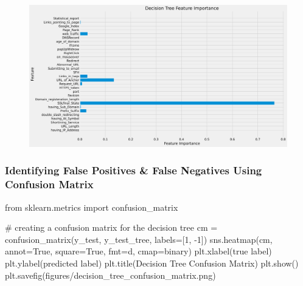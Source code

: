 \documentclass[
  letterpaper,
  DIV=11,
  numbers=noendperiod]{scrartcl}
\newenvironment{Shaded}{\begin{snugshade}}{\end{snugshade}}
\newcommand{\CommentTok}[1]{\textcolor[rgb]{0.37,0.37,0.37}{#1}}
\newcommand{\DecValTok}[1]{\textcolor[rgb]{0.68,0.00,0.00}{#1}}
\newcommand{\ImportTok}[1]{\textcolor[rgb]{0.00,0.46,0.62}{#1}}
\newcommand{\NormalTok}[1]{\textcolor[rgb]{0.00,0.23,0.31}{#1}}
\newcommand{\OperatorTok}[1]{\textcolor[rgb]{0.37,0.37,0.37}{#1}}
\newcommand{\StringTok}[1]{\textcolor[rgb]{0.13,0.47,0.30}{#1}}
\newcommand{\VariableTok}[1]{\textcolor[rgb]{0.07,0.07,0.07}{#1}}
\begin{document}
\begin{figure}[H]

{\centering \includegraphics{project_files/figure-pdf/cell-18-output-1.svg}

}

\end{figure}

\hypertarget{identifying-false-positives-false-negatives-using-confusion-matrix}{%
\subsubsection{Identifying False Positives \& False Negatives Using
Confusion
Matrix}\label{identifying-false-positives-false-negatives-using-confusion-matrix}}

\begin{Shaded}
\begin{Highlighting}[]
\ImportTok{from}\NormalTok{ sklearn.metrics }\ImportTok{import}\NormalTok{ confusion\_matrix}

\CommentTok{\# creating a confusion matrix for the decision tree}
\NormalTok{cm }\OperatorTok{=}\NormalTok{ confusion\_matrix(y\_test, y\_test\_tree, labels}\OperatorTok{=}\NormalTok{[}\DecValTok{1}\NormalTok{, }\OperatorTok{{-}}\DecValTok{1}\NormalTok{])}
\NormalTok{sns.heatmap(cm, annot}\OperatorTok{=}\VariableTok{True}\NormalTok{, square}\OperatorTok{=}\VariableTok{True}\NormalTok{, fmt}\OperatorTok{=}\StringTok{\textquotesingle{}d\textquotesingle{}}\NormalTok{, cmap}\OperatorTok{=}\StringTok{\textquotesingle{}binary\textquotesingle{}}\NormalTok{)}
\NormalTok{plt.xlabel(}\StringTok{\textquotesingle{}true label\textquotesingle{}}\NormalTok{)}
\NormalTok{plt.ylabel(}\StringTok{\textquotesingle{}predicted label\textquotesingle{}}\NormalTok{)}
\NormalTok{plt.title(}\StringTok{\textquotesingle{}Decision Tree Confusion Matrix\textquotesingle{}}\NormalTok{)}
\NormalTok{plt.show()}
\NormalTok{plt.savefig(}\StringTok{\textquotesingle{}figures/decision\_tree\_confusion\_matrix.png\textquotesingle{}}\NormalTok{)}
\end{Highlighting}
\end{Shaded}
\end{document}
